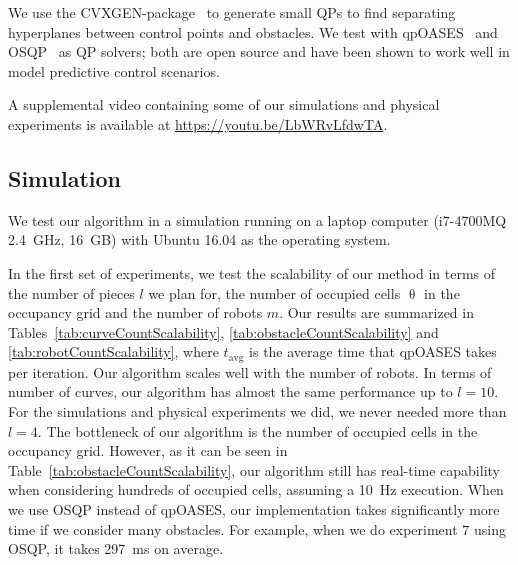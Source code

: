 \documentclass{svproc}
\begin{document}
We use the CVXGEN-package~\cite{cvxgen} to generate small QPs to find separating hyperplanes between control points and obstacles.
We test with qpOASES~\cite{qpOASES} and OSQP~\cite{osqp} as QP solvers; both are open source and have been shown to work well in model predictive control scenarios. 

A supplemental video containing some of our simulations and physical experiments is available at \url{https://youtu.be/LbWRvLfdwTA}.

\subsection{Simulation}\label{simulationSection}
We test our algorithm in a simulation running on a laptop computer (i7-4700MQ \SI{2.4}{GHz}, \SI{16}{GB}) with Ubuntu 16.04 as the operating system.

In the first set of experiments, we test the scalability of our method in terms of the number of pieces $l$ we plan for, the number of occupied cells $\uptheta$ in the occupancy grid and the number of robots $m$.
Our results are summarized in Tables~\ref{tab:curveCountScalability}, \ref{tab:obstacleCountScalability} and \ref{tab:robotCountScalability}, where $t_{\text{avg}}$ is the average time that qpOASES takes per iteration.
Our algorithm scales well with the number of robots.
In terms of number of curves, our algorithm has almost the same performance up to $l=10$. For the simulations and physical experiments we did, we never needed more than $l=4$.
The bottleneck of our algorithm is the number of occupied cells in the occupancy grid. However, as it can be seen in Table~\ref{tab:obstacleCountScalability}, our algorithm still has real-time capability when considering hundreds of occupied cells, assuming a \SI{10}{Hz} execution.
When we use OSQP instead of qpOASES, our implementation takes significantly more time if we consider many obstacles.
For example, when we do experiment $7$ using OSQP, it takes \SI{297}{ms} on average.
\end{document}

